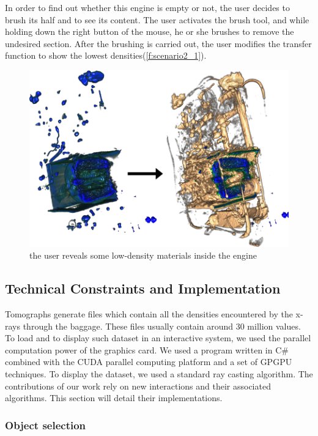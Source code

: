 In order to find out whether this engine is empty or not, the user decides to brush its half and to see its content. The user activates the brush tool, and while holding down the right button of the mouse, he or she brushes to remove the undesired section. After the brushing is carried out, the user modifies the transfer function to show the lowest densities(\autoref{f:scenario2_1}).
\begin{figure}
\centering
\includegraphics[width=\textwidth]{Figures/scenario2_3.png}
\caption{ the user reveals some low-density materials inside the engine }
\label{f:scenario2_1}
\end{figure}


\subsection{Technical Constraints and Implementation}

Tomographs generate files which contain all the densities encountered by the x-rays through the baggage. These files usually contain around 30 million values. To load and to display such dataset in an interactive system, we used the parallel computation power of the graphics card. We used a program written in C\# combined with the CUDA parallel computing platform and a set of GPGPU techniques. To display the dataset, we used a standard ray casting algorithm. The contributions of our work rely on new interactions and their associated algorithms. This section will detail their implementations.

\subsubsection{Object selection}

